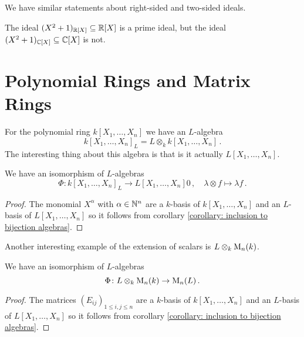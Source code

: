 \begin{rem}
  We have similar statements about right-sided and two-sided ideals.
\end{rem}


\begin{warn}
  The ideal $(X^2+1)_{\mathbb{R}[X]} \subseteq \mathbb{R}[X]$ is a prime ideal, but the ideal \mbox{$(X^2+1)_{\mathbb{C}[X]} \subseteq \mathbb{C}[X]$} is not.
\end{warn}





\section{Polynomial Rings and Matrix Rings}


For the polynomial ring $k[X_1, \dotsc, X_n]$ we have an $L$-algebra
\[
    k[X_1, \dotsc, X_n]_L
  = L \otimes_k k[X_1, \dotsc, X_n] \,.
\]
The interesting thing about this algebra is that is it actually $L[X_1, \dotsc, X_n]$.


\begin{proposition}
  We have an isomorphism of $L$-algebras
  \[
            \Phi
    \colon  k[X_1, \dotsc, X_n]_L
    \to     L[X_1, \dotsc, X_n]0\,,
    \quad   \lambda \otimes f
    \mapsto \lambda f \,.
  \]
\end{proposition}
\begin{proof}
  The monomial $X^\alpha$ with $\alpha \in \mathbb{N}^n$ are a $k$-basis of $k[X_1, \dotsc, X_n]$ and an $L$-basis of $L[X_1, \dotsc, X_n]$ so it follows from corollary \ref{corollary: inclusion to bijection algebras}.
\end{proof}


Another interesting example of the extension of scalars is $L \otimes_k \operatorname{M}_n(k)$.


\begin{proposition}
  We have an isomorphism of $L$-algebras
  \[
    \Phi \colon L \otimes_k \operatorname{M}_n(k) \to \operatorname{M}_n(L) \,.
  \]
\end{proposition}
\begin{proof}
  The matrices $(E_{ij})_{1 \leq i,j \leq n}$ are a $k$-basis of $k[X_1, \dotsc, X_n]$ and an $L$-basis of $L[X_1, \dotsc, X_n]$ so it follows from corollary \ref{corollary: inclusion to bijection algebras}.
\end{proof}




